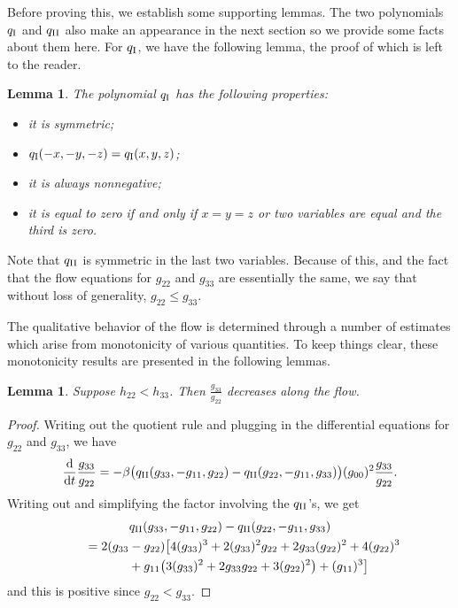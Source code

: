 \documentclass[pdftex]{sigma}
\numberwithin{equation}{section}
\newtheorem{Lemma}[Theorem]{Lemma}
\newcommand{\dtime}{\frac{{\rm d}}{{\rm d} t}} %
\begin{document}
Before proving this, we establish some supporting lemmas. The two polynomials $q_{\rm I}$ and $q_{\rm II}$ also make an appearance in the next section so we provide some facts about them here. For $q_{\rm I}$, we have the following lemma, the proof of which is left to the reader.

\begin{Lemma} \label{ppropslemma} The polynomial $q_{\rm I}$ has the following properties:
\begin{itemize}\itemsep=0pt
\item it is symmetric;
\item $q_{\rm I}(-x, -y, -z) = q_{\rm I}(x, y, z)$;
\item it is always nonnegative;
\item it is equal to zero if and only if $x = y = z$ or two variables are equal and the third is zero.
\end{itemize}
\end{Lemma}

Note that $q_{\rm II}$ is symmetric in the last two variables. Because of this, and the fact that the flow equations for $g_{22}$ and $g_{33}$ are essentially the same, we say that without loss of generality, $g_{22} \leq g_{33}$.

The qualitative behavior of the flow is determined through a number of estimates which arise from monotonicity of various quantities. To keep things clear, these monotonicity results are presented in the following lemmas.

\begin{Lemma} \label{g33g22fraclemma}
Suppose $h_{22} < h_{33}$. Then $\frac{g_{33}}{g_{22}}$ decreases along the flow.
\end{Lemma}

\begin{proof}
Writing out the quotient rule and plugging in the differential equations for $g_{22}$ and $g_{33}$, we have
\[
\dtime \frac{g_{33}}{g_{22}}
	= -\beta \bigl(q_{\rm II}(g_{33}, -g_{11}, g_{22}) - q_{\rm II}(g_{22}, -g_{11}, g_{33}) \bigr) (g_{00})^2 \frac{g_{33}}{g_{22}}.
\]
Writing out and simplifying the factor involving the $q_{\rm II}$'s, we get
\begin{gather*}
q_{\rm II}(g_{33}, -g_{11}, g_{22}) - q_{\rm II}(g_{22}, -g_{11}, g_{33}) \\
\qquad{}= 2(g_{33}-g_{22})\big[4(g_{33})^3 + 2(g_{33})^2g_{22} + 2g_{33}(g_{22})^2 + 4(g_{22})^3 \\
 \qquad \quad {} + g_{11}\big(3(g_{33})^2 + 2g_{33}g_{22} + 3(g_{22})^2\big) + (g_{11})^3\big]
\end{gather*}
and this is positive since $g_{22} < g_{33}.$
\end{proof}
\end{document}
